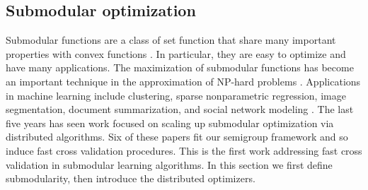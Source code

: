 \documentclass[thesis.tex]{subfiles}
\newcommand{\wpca}{\hat\w^\textit{pca}}
\newcommand{\wlbk}{\hat\w^\textit{lbk}}
\begin{document}

%


\subsection{Submodular optimization}
\label{sec:merge:submodular}

Submodular functions are a class of set function that share many important properties with convex functions \citep{lovasz1983submodular}.
In particular, they are easy to optimize and have many applications. 
The maximization of submodular functions has become an important technique in the approximation of NP-hard problems \citep{krause14survey}.
Applications in machine learning include clustering, sparse nonparametric regression, image segmentation, document summarization, and social network modeling \citep[see references within][]{mirzasoleiman2016distributed}.
The last five years has seen work focused on scaling up submodular optimization via distributed algorithms.
Six of these papers fit our semigroup framework
\citep{mirzasoleiman2013distributed,barbosa2015power,malkomes2015fast,bhaskara2016greedy,barbosa2016new,mirzasoleiman2016distributed}
and so induce fast cross validation procedures.
This is the first work addressing fast cross validation in submodular learning algorithms.
In this section we first define submodularity,
then introduce the distributed optimizers.
\end{document}

